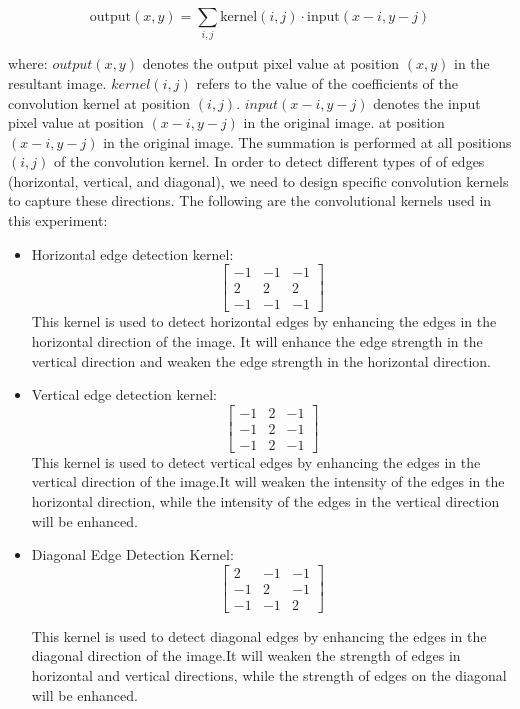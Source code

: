 \documentclass[a4paper,12pt]{article}
\begin{document}
\begin{equation}
\text{output}(x, y) = \sum_{i, j} \text{kernel}(i, j) \cdot \text{input}(x - i, y - j)
\end{equation}

where:
$output(x, y)$ denotes the output pixel value at position $(x, y)$ in the resultant image. $kernel(i, j)$ refers to the value of the
coefficients of the convolution kernel at position $(i, j)$. $input(x-i, y-j)$ denotes the input pixel value at position $(x-i, y-j)$ in the original image.
at position $(x-i, y-j)$ in the original image. The summation is performed at all positions $(i, j)$ of the convolution kernel. In order to detect different types of
of edges (horizontal, vertical, and diagonal), we need to design specific convolution kernels to capture these directions. The
following are the convolutional kernels used in this experiment:
\begin{itemize}
  \item Horizontal edge detection kernel:
  \[
  \begin{bmatrix}
    -1 & -1 & -1 \\
     2 &  2 &  2 \\
    -1 & -1 & -1
  \end{bmatrix}
  \]
  This kernel is used to detect horizontal edges by enhancing the edges in the horizontal direction of the image. It will enhance the edge strength in the vertical direction and weaken the edge strength in the horizontal direction.

  \item Vertical edge detection kernel:
  \[
  \begin{bmatrix}
    -1 &  2 & -1 \\
    -1 &  2 & -1 \\
    -1 &  2 & -1
  \end{bmatrix}
  \]
  This kernel is used to detect vertical edges by enhancing the edges in the vertical direction of the image.It will weaken the intensity of the edges in the horizontal direction, while the intensity of the edges in the vertical direction will be enhanced.

  \item Diagonal Edge Detection Kernel:
  \[
  \begin{bmatrix}
     2 & -1 & -1 \\
    -1 &  2 & -1 \\
    -1 & -1 &  2
  \end{bmatrix}
  \]
  
  This kernel is used to detect diagonal edges by enhancing the edges in the diagonal direction of the image.It will weaken the strength of edges in horizontal and vertical directions, while the strength of edges on the diagonal will be enhanced.
  
\end{itemize}
\end{document}

